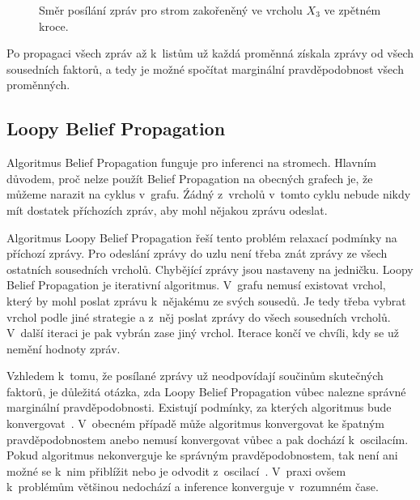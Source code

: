 \begin{figure}[H]
\begin{center}
\end{center}
\caption{Směr posílání zpráv pro strom zakořeněný ve vrcholu $X_3$ ve zpětném kroce.}
\end{figure}

Po propagaci všech zpráv až k~listům už každá proměnná získala zprávy od všech sousedních faktorů, a tedy je možné spočítat marginální pravděpodobnost všech proměnných.

\subsection{Loopy Belief Propagation}
\label{sec:lbp}

Algoritmus Belief Propagation funguje pro inferenci na stromech.
Hlavním důvodem, proč nelze použít Belief Propagation na obecných grafech je, že můžeme narazit na cyklus v~grafu.
Źádný z~vrcholů v~tomto cyklu nebude nikdy mít dostatek příchozích zpráv, aby mohl nějakou zprávu odeslat.

Algoritmus Loopy Belief Propagation řeší tento problém relaxací podmínky na příchozí zprávy.
Pro odeslání zprávy do uzlu není třeba znát zprávy ze všech ostatních sousedních vrcholů.
Chybějící zprávy jsou nastaveny na jedničku.
Loopy Belief Propagation je iterativní algoritmus.
V~grafu nemusí existovat vrchol, který by mohl poslat zprávu k~nějakému ze svých sousedů.
Je tedy třeba vybrat vrchol podle jiné strategie a z~něj poslat zprávy do všech sousedních vrcholů.
V~další iteraci je pak vybrán zase jiný vrchol.
Iterace končí ve chvíli, kdy se už nemění hodnoty zpráv.

Vzhledem k~tomu, že posílané zprávy už neodpovídají součinům skutečných faktorů, je důležitá otázka, zda Loopy Belief Propagation vůbec nalezne správné marginální pravděpodobnosti.
Existují podmínky, za kterých algoritmus bude konvergovat~\cite{tatikonda2002loopy}.
V~obecném případě může algoritmus konvergovat ke špatným pravděpodobnostem anebo nemusí konvergovat vůbec a pak dochází k~oscilacím.
Pokud algoritmus nekonverguje ke správným pravděpodobnostem, tak není ani možné se k~nim přiblížit nebo je odvodit z~oscilací~\cite{murphy1999loopy}.
V~praxi ovšem k~problémům většinou nedochází a inference konverguje v~rozumném čase.

